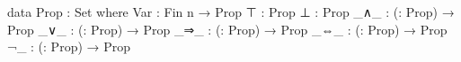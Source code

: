 data Prop : Set where
  Var : Fin n → Prop
  ⊤   : Prop
  ⊥   : Prop
  _∧_ : (\varphi \psi : Prop) → Prop
  _∨_ : (\varphi \psi : Prop) → Prop
  _⇒_ : (\varphi \psi : Prop) → Prop
  _⇔_ : (\varphi \psi : Prop) → Prop
  ¬_  : (\varphi : Prop)   → Prop
